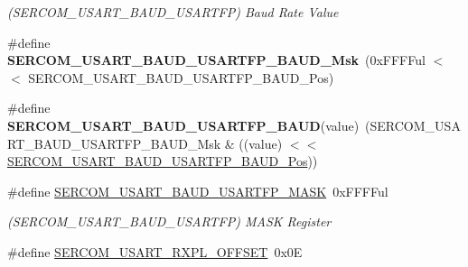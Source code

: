 \begin{DoxyCompactItemize}
\begin{DoxyCompactList}\small\item\em (S\+E\+R\+C\+O\+M\+\_\+\+U\+S\+A\+R\+T\+\_\+\+B\+A\+U\+D\+\_\+\+U\+S\+A\+R\+T\+F\+P) Baud Rate Value \end{DoxyCompactList}\item 
\hypertarget{group___s_a_m_l21___s_e_r_c_o_m_ga7888fc3928c96efc70d4be2e98b223c2}{}\#define {\bfseries S\+E\+R\+C\+O\+M\+\_\+\+U\+S\+A\+R\+T\+\_\+\+B\+A\+U\+D\+\_\+\+U\+S\+A\+R\+T\+F\+P\+\_\+\+B\+A\+U\+D\+\_\+\+Msk}~(0x\+F\+F\+F\+Ful $<$$<$ S\+E\+R\+C\+O\+M\+\_\+\+U\+S\+A\+R\+T\+\_\+\+B\+A\+U\+D\+\_\+\+U\+S\+A\+R\+T\+F\+P\+\_\+\+B\+A\+U\+D\+\_\+\+Pos)\label{group___s_a_m_l21___s_e_r_c_o_m_ga7888fc3928c96efc70d4be2e98b223c2}

\item 
\hypertarget{group___s_a_m_l21___s_e_r_c_o_m_ga468432dd5855c84d539c25a92d9ad71f}{}\#define {\bfseries S\+E\+R\+C\+O\+M\+\_\+\+U\+S\+A\+R\+T\+\_\+\+B\+A\+U\+D\+\_\+\+U\+S\+A\+R\+T\+F\+P\+\_\+\+B\+A\+U\+D}(value)~(S\+E\+R\+C\+O\+M\+\_\+\+U\+S\+A\+R\+T\+\_\+\+B\+A\+U\+D\+\_\+\+U\+S\+A\+R\+T\+F\+P\+\_\+\+B\+A\+U\+D\+\_\+\+Msk \& ((value) $<$$<$ \hyperlink{group___s_a_m_l21___s_e_r_c_o_m_gaf86d9c38d1591af77a7b7a1007ccd5d6}{S\+E\+R\+C\+O\+M\+\_\+\+U\+S\+A\+R\+T\+\_\+\+B\+A\+U\+D\+\_\+\+U\+S\+A\+R\+T\+F\+P\+\_\+\+B\+A\+U\+D\+\_\+\+Pos}))\label{group___s_a_m_l21___s_e_r_c_o_m_ga468432dd5855c84d539c25a92d9ad71f}

\item 
\hypertarget{group___s_a_m_l21___s_e_r_c_o_m_gaf8f29806e91b6b1c8988b77d9a4ad57e}{}\#define \hyperlink{group___s_a_m_l21___s_e_r_c_o_m_gaf8f29806e91b6b1c8988b77d9a4ad57e}{S\+E\+R\+C\+O\+M\+\_\+\+U\+S\+A\+R\+T\+\_\+\+B\+A\+U\+D\+\_\+\+U\+S\+A\+R\+T\+F\+P\+\_\+\+M\+A\+S\+K}~0x\+F\+F\+F\+Ful\label{group___s_a_m_l21___s_e_r_c_o_m_gaf8f29806e91b6b1c8988b77d9a4ad57e}

\begin{DoxyCompactList}\small\item\em (S\+E\+R\+C\+O\+M\+\_\+\+U\+S\+A\+R\+T\+\_\+\+B\+A\+U\+D\+\_\+\+U\+S\+A\+R\+T\+F\+P) M\+A\+S\+K Register \end{DoxyCompactList}\item 
\hypertarget{group___s_a_m_l21___s_e_r_c_o_m_ga7db2ab9a5f0dc5f8eac0158ea52a80c0}{}\#define \hyperlink{group___s_a_m_l21___s_e_r_c_o_m_ga7db2ab9a5f0dc5f8eac0158ea52a80c0}{S\+E\+R\+C\+O\+M\+\_\+\+U\+S\+A\+R\+T\+\_\+\+R\+X\+P\+L\+\_\+\+O\+F\+F\+S\+E\+T}~0x0\+E\label{group___s_a_m_l21___s_e_r_c_o_m_ga7db2ab9a5f0dc5f8eac0158ea52a80c0}


\end{DoxyCompactItemize}
